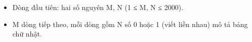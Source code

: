 \begin{itemize}
	\item Dòng đầu tiên: hai số nguyên M, N (1 ≤ M, N ≤ 2000).
	\item M dòng tiếp theo, mỗi dòng gồm N số 0 hoặc 1 (viết liền nhau) mô tả bảng chữ nhật.
\end{itemize}

\